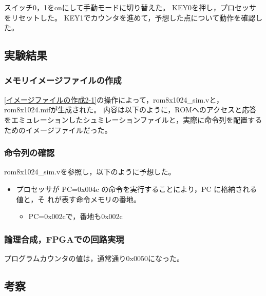 スイッチ0，1をonにして手動モードに切り替えた。
KEY0を押し，プロセッサをリセットした。
KEY1でカウンタを進めて，予想した点について動作を確認した。

\subsection{実験結果}
\subsubsection{メモリイメージファイルの作成}
\ref{イメージファイルの作成2-1}の操作によって，rom8x1024\_sim.vと，rom8x1024.mifが生成された。
内容は以下のように，ROMへのアクセスと応答をエミュレーションしたシュミレーションファイルと，実際に命令列を配置するためのイメージファイルだった。





\subsubsection{命令列の確認}
rom8x1024\_sim.vを参照し，以下のように予想した。
\begin{itemize}
  \item プロセッサが PC=0x004c の命令を実行することにより，PC に格納される値と，そ
  れが表す命令メモリの番地。
  \begin{itemize}
    \item PC=0x002cで，番地も0x002c
  \end{itemize}
\end{itemize}

\subsubsection{論理合成，FPGAでの回路実現}
プログラムカウンタの値は，通常通り0x0050になった。

\subsection{考察}
